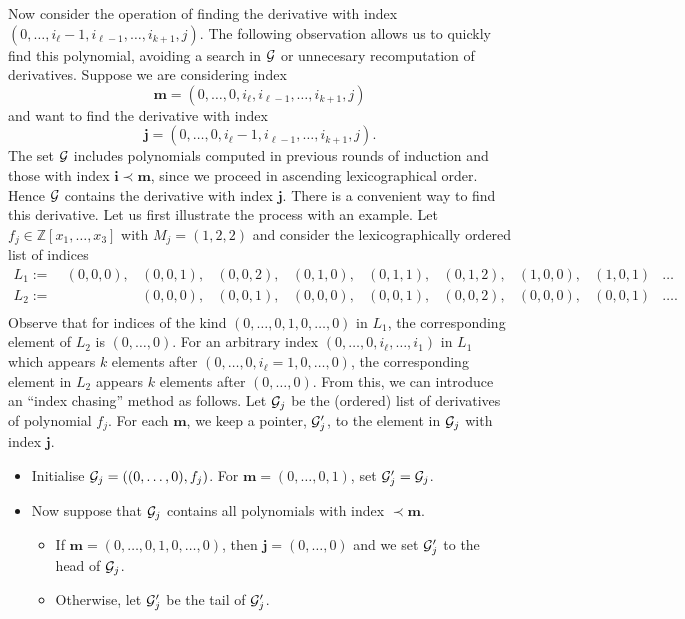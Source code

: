 \documentclass[
]{book}
\providecommand{\tightlist}{%
  \setlength{\itemsep}{0pt}\setlength{\parskip}{0pt}}
\theoremstyle{definition}
\theoremstyle{definition}
\theoremstyle{definition}
\theoremstyle{definition}
\theoremstyle{remark}
\begin{document}
Now consider the operation of finding the derivative with index \((0,\ldots,i_\ell - 1,i_{\ell - 1}, \ldots, i_{k+1},j)\). The following observation allows us to quickly find this polynomial, avoiding a search in \(\cal G\) or unnecesary recomputation of derivatives.
Suppose we are considering index
\[
\mathbf{m} = (0,\ldots,0,i_\ell,i_{\ell - 1},\ldots,i_{k+1},j)\]
and want to find the derivative with index
\[
\mathbf{j} = (0,\ldots,0,i_\ell - 1,i_{\ell - 1},\ldots,i_{k+1},j).\]
The set \(\cal G\) includes polynomials computed in previous rounds of induction and those with index \(\mathbf{i} \prec \mathbf{m}\), since we proceed in ascending lexicographical order. Hence \(\cal G\) contains the derivative with index \(\mathbf{j}\).
There is a convenient way to find this derivative.
Let us first illustrate the process with an example. Let \(f_j \in \mathbb{Z}[x_1,\ldots,x_3]\) with \(M_j = (1,2,2)\) and consider the lexicographically ordered list of indices
\[
\begin{matrix}
L_1 :=\ &  (0,0,0),&(0,0,1),&(0,0,2),&(0,1,0),&(0,1,1),&(0,1,2),&(1,0,0),&(1,0,1)&\ldots\\
L_2 := \ & & (0,0,0),&(0,0,1),&(0,0,0),&(0,0,1),&(0,0,2),&(0,0,0),&(0,0,1)&\ldots.\\
\end{matrix}
\]
Observe that for indices of the kind \((0,\ldots,0,1,0,\ldots,0)\) in \(L_1\), the corresponding element of \(L_2\) is \((0,\ldots,0)\). For an arbitrary index \((0,\ldots,0,i_\ell,\ldots,i_1)\) in \(L_1\) which appears \(k\) elements after \((0,\ldots,0,i_\ell = 1,0,\ldots,0)\), the corresponding element in \(L_2\) appears \(k\) elements after \((0,\ldots,0)\).
From this, we can introduce an ``index chasing'' method as follows. Let \({\cal G}_j\) be the (ordered) list of derivatives of polynomial \(f_j\). For each \(\mathbf{m}\), we keep a pointer, \({\cal G}'_j\), to the element in \({\cal G}_j\) with index \(\mathbf{j}\).

\begin{itemize}
\tightlist
\item
  Initialise \({\cal G}_j = ((0,\ldots,0),f_j)\). For \(\mathbf{m} = (0,\ldots,0,1)\), set \({\cal G}'_j = {\cal G}_j\).
\item
  Now suppose that \({\cal G}_j\) contains all polynomials with index \(\prec \mathbf{m}\).

  \begin{itemize}
  \tightlist
  \item
    If \(\mathbf{m} = (0,\ldots,0,1,0,\ldots,0)\), then \(\mathbf{j} = (0,\ldots,0)\) and we set \({\cal G}'_j\) to the head of \({\cal G}_j\).
  \item
    Otherwise, let \({\cal G}'_j\) be the tail of \({\cal G}'_j\).
  \end{itemize}
\end{itemize}
\end{document}
